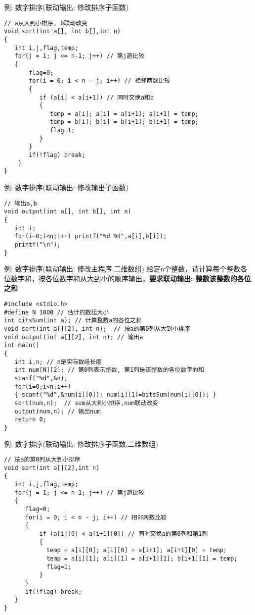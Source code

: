 \begin{frame}{例: 数字排序(联动输出: 修改排序子函数)}
\begin{lstlisting}
// a从大到小排序, b联动改变
void sort(int a[], int b[],int n)
{
   int i,j,flag,temp;
   for(j = 1; j <= n-1; j++) // 第j趟比较
   {
       flag=0;
       for(i = 0; i < n - j; i++) // 相邻两数比较
       {
          if (a[i] < a[i+1]) // 同时交换a和b
          { 
             temp = a[i]; a[i] = a[i+1]; a[i+1] = temp; 
             temp = b[i]; b[i] = b[i+1]; b[i+1] = temp; 
             flag=1;
          }
       }
       if(!flag) break;
    }
}
\end{lstlisting}
\end{frame}

\begin{frame}{例: 数字排序(联动输出: 修改输出子函数)}
\begin{lstlisting}
// 输出a,b
void output(int a[], int b[], int n)
{
   int i;
   for(i=0;i<n;i++) printf("%d %d",a[i],b[i]);
   printf("\n");
}
\end{lstlisting}
\end{frame}

\begin{frame}{例: 数字排序(联动输出: 修改主程序,二维数组)}
给定n个整数，请计算每个整数各位数字和，按各位数字和从大到小的顺序输出。\textbf{要求联动输出: 整数\quad 该整数的各位之和}
\begin{lstlisting}
#include <stdio.h>
#define N 1000 // 估计的数组大小
int bitsSum(int a); // 计算整数a的各位之和
void sort(int a[][2], int n);  // 按a的第0列从大到小排序
void output(int a[][2], int n); // 输出a
int main()
{
   int i,n; // n是实际数组长度 
   int num[N][2]; // 第0列表示整数, 第1列是该整数的各位数字的和  
   scanf("%d",&n);
   for(i=0;i<n;i++) 
   { scanf("%d",&num[i][0]); num[i][1]=bitsSum(num[i][0]); }
   sort(num,n);  // sum从大到小排序,num联动改变
   output(num,n); // 输出num
   return 0;
}
\end{lstlisting}
\end{frame}

\begin{frame}{例: 数字排序(联动输出: 修改排序子函数,二维数组)}
\begin{lstlisting}
// 按a的第0列从大到小排序
void sort(int a[][2],int n)
{
   int i,j,flag,temp;
   for(j = 1; j <= n-1; j++) // 第j趟比较
   {
      flag=0;
      for(i = 0; i < n - j; i++) // 相邻两数比较
      {
          if (a[i][0] < a[i+1][0]) // 同时交换a的第0列和第1列
          { 
            temp = a[i][0]; a[i][0] = a[i+1]; a[i+1][0] = temp; 
            temp = a[i][1]; a[i][1] = a[i+1][1]; b[i+1][1] = temp; 
            flag=1;
          }
      }
      if(!flag) break;
   }
}
\end{lstlisting}
\end{frame}

